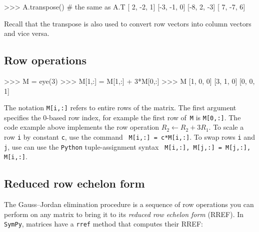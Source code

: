 \small
\begin{verbatimtab}
>>> A.transpose()    # the same as A.T
[ 2, -2,  1]
[-3, -1,  0]
[-8,  2, -3]
[ 7, -7,  6]
\end{verbatimtab}
\normalsize

\noindent
Recall that the transpose is also used to convert row vectors into column vectors and vice versa.


\subsection{Row operations}
\label{matrices:row_operations}

\small
\begin{verbatimtab}
>>> M = eye(3)
>>> M[1,:] = M[1,:] + 3*M[0,:]
>>> M
[1, 0, 0]
[3, 1, 0]
[0, 0, 1] \end{verbatimtab}
\normalsize

The notation \texttt{M[i,:]} refers to entire rows of the matrix.
The first argument specifies the $0$-based row index,
for example the first row of~\texttt{M} is \texttt{M[0,:]}.
The code example above implements the row operation $R_2 \gets R_2 + 3R_1$.
To scale a row \texttt{i} by constant \texttt{c}, use the command \texttt{ M[i,:] = c*M[i,:]}.
To swap rows \texttt{i} and \texttt{j}, use can use the \texttt{Python} tuple-assignment syntax \texttt{ M[i,:], M[j,:] = M[j,:], M[i,:]}.

\vspace{-2mm}

\subsection{Reduced row echelon form}
\label{matrices:reduced_row_echelon_form}

The Gauss--Jordan elimination procedure is a sequence of row operations you can perform
on any matrix to bring it to its \emph{reduced row echelon form} (RREF).
In \texttt{SymPy}, matrices have a \texttt{rref} method that computes their RREF: 

